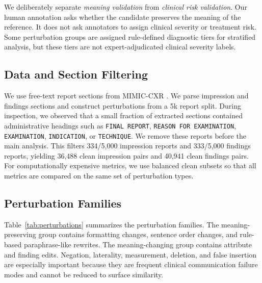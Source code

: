 \documentclass[11pt]{article}
\newcommand{\pres}{meaning-preserving\xspace}
\newcommand{\chg}{meaning-changing\xspace}
\begin{document}
We deliberately separate \emph{meaning validation} from \emph{clinical risk validation}. Our human annotation asks whether the candidate preserves the meaning of the reference. It does not ask annotators to assign clinical severity or treatment risk. Some perturbation groups are assigned rule-defined diagnostic tiers for stratified analysis, but these tiers are not expert-adjudicated clinical severity labels.

\subsection{Data and Section Filtering}

We use free-text report sections from MIMIC-CXR \citep{johnson-etal-2019-mimiccxr}. We parse impression and findings sections and construct perturbations from a 5k report split. During inspection, we observed that a small fraction of extracted sections contained administrative headings such as \texttt{FINAL REPORT}, \texttt{REASON FOR EXAMINATION}, \texttt{EXAMINATION}, \texttt{INDICATION}, or \texttt{TECHNIQUE}. We remove these reports before the main analysis. This filters 334/5,000 impression reports and 333/5,000 findings reports, yielding 36,488 clean impression pairs and 40,941 clean findings pairs. For computationally expensive metrics, we use balanced clean subsets so that all metrics are compared on the same set of perturbation types.

\subsection{Perturbation Families}

Table~\ref{tab:perturbations} summarizes the perturbation families. The \pres group contains formatting changes, sentence order changes, and rule-based paraphrase-like rewrites. The \chg group contains attribute and finding edits. Negation, laterality, measurement, deletion, and false insertion are especially important because they are frequent clinical communication failure modes and cannot be reduced to surface similarity.
\end{document}
